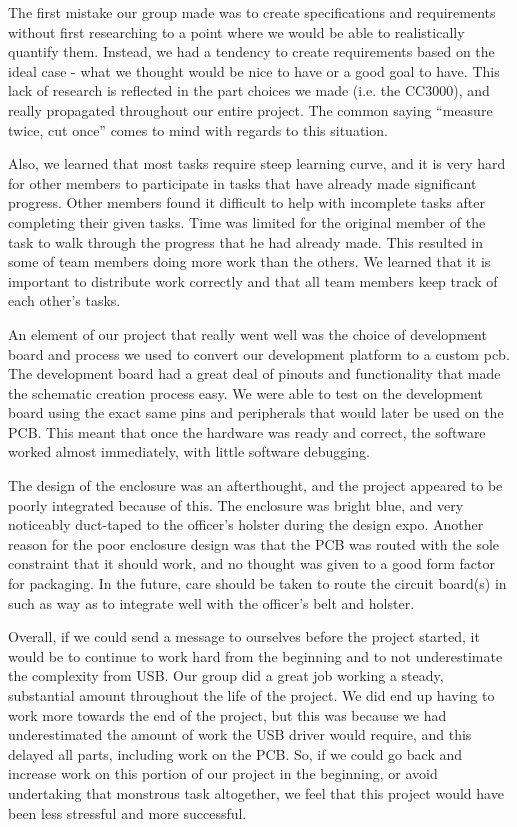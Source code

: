 \documentclass[12pt]{article}
\begin{document}
The first mistake our group made was to create specifications and requirements
without first researching to a point where we would be able to realistically
quantify them. Instead, we had a tendency to create requirements based on the
ideal case - what we thought would be nice to have or a good goal to have. This
lack of research is reflected in the part choices we made (i.e. the CC3000),
and really propagated throughout our entire project. The common saying
``measure twice, cut once'' comes to mind with regards to this situation.

Also, we learned that most tasks require steep learning curve, and it is very
hard for other members to participate in tasks that have already made
significant progress. Other members found it difficult to help with incomplete
tasks after completing their given tasks. Time was limited for the original
member of the task to walk through the progress that he had already made. This
resulted in some of team members doing more work than the others. We learned
that it is important to distribute work correctly and that all team members
keep track of each other's tasks.

An element of our project that really went well was the choice of development
board and process we used to convert our development platform to a custom
\gls{pcb}.  The development board had a great deal of pinouts and functionality
that made the schematic creation process easy. We were able to test on the
development board using the exact same pins and peripherals that would later be
used on the PCB. This meant that once the hardware was ready and correct, the
software worked almost immediately, with little software debugging.

The design of the enclosure was an afterthought, and the project appeared to be
poorly integrated because of this. The enclosure was bright blue, and very
noticeably duct-taped to the officer's holster during the design expo. Another
reason for the poor enclosure design was that the PCB was routed with the sole
constraint that it should work, and no thought was given to a good form factor
for packaging. In the future, care should be taken to route the circuit
board(s) in such as way as to integrate well with the officer's belt and
holster.

Overall, if we could send a message to ourselves before the project started, it
would be to continue to work hard from the beginning and to not underestimate
the complexity from USB. Our group did a great job working a steady,
substantial amount throughout the life of the project. We did end up having to
work more towards the end of the project, but this was because we had
underestimated the amount of work the USB driver would require, and this
delayed all parts, including work on the PCB. So, if we could go back and
increase work on this portion of our project in the beginning, or avoid
undertaking that monstrous task altogether, we feel that this project would
have been less stressful and more successful.
\end{document}
